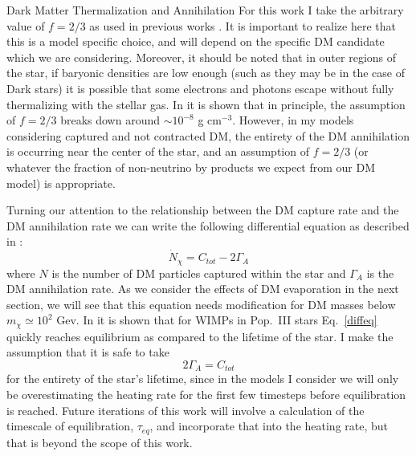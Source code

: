 \documentclass[a4paper,11pt]{article}
\begin{document}
\begin{section}{Dark Matter Thermalization and Annihilation}
    For this work I take the arbitrary value of $f = 2/3$ as used in previous works \cite{Ilie:2019}.
    It is important to realize here that this is a model specific choice, and will depend on the specific DM candidate which we are considering. 
    Moreover, it should be noted that in outer regions of the star, if baryonic densities are low enough (such as they may be in the case of Dark stars) it is possible that some electrons and photons escape without fully thermalizing with the stellar gas.
    In \cite{Rindler-Daller:2020} it is shown that in principle, the assumption of $f = 2/3$ breaks down around $\sim 10^{-8}$ g cm$^{-3}$.
    However, in my models considering captured and not contracted DM, the entirety of the DM annihilation is occurring near the center of the star, and an assumption of $f=2/3$ (or whatever the fraction of non-neutrino by products we expect from our DM model) is appropriate. 

    Turning our attention to the relationship between the DM capture rate and the DM annihilation rate we can write the following differential equation as described in \cite{Ilie:2019}:
    \begin{equation}
        \dot{N}_\chi = C_{tot} - 2\Gamma_A 
        \label{diffeq}
    \end{equation}
    where $N$ is the number of DM particles captured within the star and $\Gamma_A$ is the DM annihilation rate.
    As we consider the effects of DM evaporation in the next section, we will see that this equation needs modification for DM masses below $m_\chi \simeq 10^2$ Gev.
    In \cite{Freese:2008cap} it is shown that for WIMPs in Pop.~III stars Eq.~\ref{diffeq} quickly reaches equilibrium as compared to the lifetime of the star. I make the assumption that it is safe to take
    \begin{equation}
        2\Gamma_A = C_{tot} 
        \label{rates}
    \end{equation}
    for the entirety of the star's lifetime, since in the models I consider we will only be overestimating the heating rate for the first few timesteps before equilibration is reached.
    Future iterations of this work will involve a calculation of the timescale of equilibration, $\tau_{eq}$, and incorporate that into the heating rate, but that is beyond the scope of this work.
\end{section}
\end{document}
